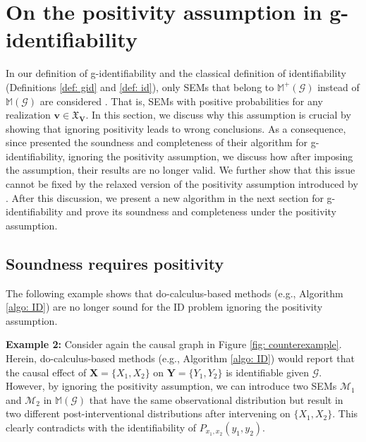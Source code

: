 \documentclass[accepted]{uai2022}
\newcommand{\V}[0]{\mathbf{V}}
\newcommand{\G}[0]{\mathcal{G}}
\newcommand{\M}[0]{\mathcal{M}}
\newcommand{\dom}[1]{\mathfrak{X}_{#1}}
\begin{document}
\section{On the positivity assumption in g-identifiability} \label{sec: positivity}
    In our definition of g-identifiability and the classical definition of identifiability (Definitions \ref{def: gid} and \ref{def: id}), only SEMs that belong to $\mathbb{M}^+(\G)$ instead of $\mathbb{M}(\G)$ are considered \citep{huang2008completeness,shpitser2006identification}.
    That is, SEMs with positive probabilities for any realization $\mathbf{v} \in \dom{\V}$. 
    In this section, we discuss why this assumption is crucial by showing that ignoring positivity leads to wrong conclusions.
    As a consequence, since \cite{lee2019general} presented the soundness and completeness of their algorithm for g-identifiability, ignoring the positivity assumption, we discuss how after imposing the assumption, their results are no longer valid.
    We further show that this issue cannot be fixed by the relaxed version of the positivity assumption introduced by \citep{shpitser2006identification}.
    After this discussion, we present a new algorithm in the next section for g-identifiability and prove its soundness and completeness under the positivity assumption.
    
    \subsection{Soundness requires positivity}
        The following example shows that do-calculus-based methods (e.g., Algorithm \ref{algo: ID}) are no longer sound for the ID problem ignoring the positivity assumption.
        
        \textbf{Example 2:}
        Consider again the causal graph in Figure \ref{fig: counterexample}.
        Herein, do-calculus-based methods (e.g., Algorithm \ref{algo: ID}) would report that the causal effect of $\mathbf{X}=\{X_1,X_2\}$ on $\mathbf{Y}=\{Y_1,Y_2\}$ is identifiable given $\G$.
        However, by ignoring the positivity assumption, we can introduce two SEMs $\M_1$ and $\M_2$ in $\mathbb{M}(\G)$ that have the same observational distribution but result in two different post-interventional distributions after intervening on $\{X_1,X_2\}$. 
        This clearly contradicts with the identifiability of $P_{x_1,x_2}(y_1,y_2)$.
        
\end{document}
